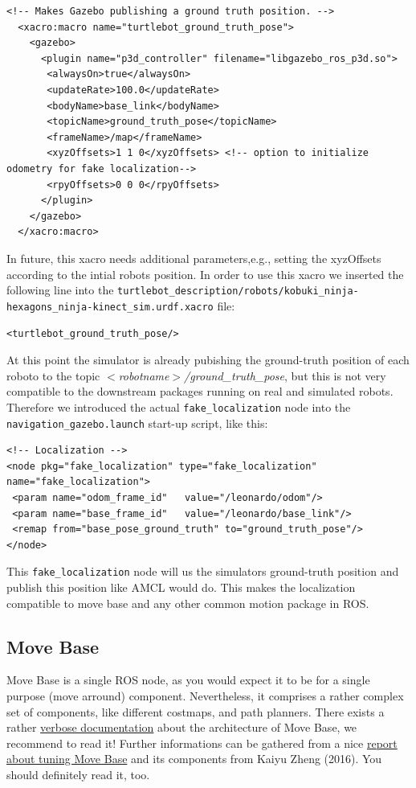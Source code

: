 \begin{Verbatim}[fontsize=\scriptsize]
 <!-- Makes Gazebo publishing a ground truth position. -->
  <xacro:macro name="turtlebot_ground_truth_pose">
    <gazebo>
      <plugin name="p3d_controller" filename="libgazebo_ros_p3d.so">
       <alwaysOn>true</alwaysOn>
       <updateRate>100.0</updateRate>
       <bodyName>base_link</bodyName>
       <topicName>ground_truth_pose</topicName>
       <frameName>/map</frameName>
       <xyzOffsets>1 1 0</xyzOffsets> <!-- option to initialize odometry for fake localization-->
       <rpyOffsets>0 0 0</rpyOffsets>
      </plugin>
    </gazebo>
  </xacro:macro>
\end{Verbatim}

In future, this xacro needs additional parameters,e.g., setting the xyzOffsets according to the intial robots position. In order to use this xacro we inserted the following line into the \verb$turtlebot_description/robots/kobuki_ninja-hexagons_ninja-kinect_sim.urdf.xacro$ file:

\verb$<turtlebot_ground_truth_pose/>$

At this point the simulator is already pubishing the ground-truth position of each roboto to the topic \emph{$<$robotname$>$/ground\_truth\_pose}, but this is not very compatible to the downstream packages running on real and simulated robots. Therefore we introduced the actual \verb$fake_localization$ node into the \verb$navigation_gazebo.launch$ start-up script, like this:

\begin{Verbatim}[fontsize=\scriptsize]
<!-- Localization -->
<node pkg="fake_localization" type="fake_localization" name="fake_localization">
 <param name="odom_frame_id"   value="/leonardo/odom"/>
 <param name="base_frame_id"   value="/leonardo/base_link"/>
 <remap from="base_pose_ground_truth" to="ground_truth_pose"/>
</node>
\end{Verbatim}

This \verb$fake_localization$ node will us the simulators ground-truth position and publish this position like AMCL would do. This makes the localization compatible to move base and any other common motion package in ROS. 

\subsection{Move Base}
\label{ssec:MoveBase}

Move Base is a single ROS node, as you would expect it to be for a single purpose (move arround) component. Nevertheless, it comprises a rather complex set of components, like different costmaps, and path planners. There exists a rather \href{http://wiki.ros.org/move_base}{verbose documentation} about the architecture of Move Base, we recommend to read it! Further informations can be gathered from a nice \href{http://kaiyuzheng.me/documents/navguide.pdf}{report about tuning Move Base} and its components from Kaiyu Zheng (2016). You should definitely read it, too.

